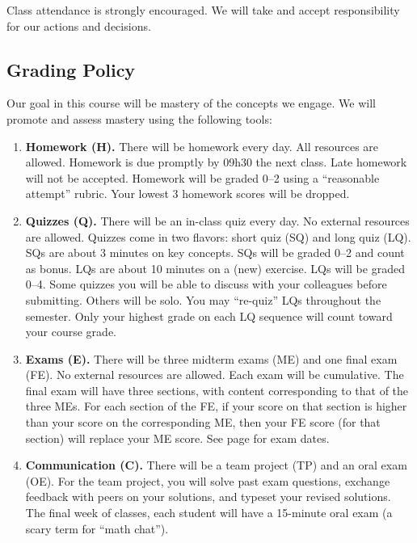 Class attendance is strongly encouraged. We will take and accept responsibility for our actions and decisions.





%
%
%
%

\subsection{Grading Policy}

Our goal in this course will be mastery of the concepts we engage. We will promote and assess mastery using the following tools:
\begin{enumerate}
\item \textbf{Homework (H).} There will be homework every day. All resources are allowed. Homework is due promptly by 09h30 the next class. Late homework will not be accepted. Homework will be graded 0--2 using a ``reasonable attempt'' rubric. Your lowest 3 homework scores will be dropped.
\item \textbf{Quizzes (Q).} There will be an in-class quiz every day. No external resources are allowed. Quizzes come in two flavors: short quiz (SQ) and long quiz (LQ). SQs are about 3 minutes on key concepts. SQs will be graded 0--2 and count as bonus. LQs are about 10 minutes on a (new) exercise. LQs will be graded 0--4. Some quizzes you will be able to discuss with your colleagues before submitting. Others will be solo. You may ``re-quiz'' LQs throughout the semester. Only your highest grade on each LQ sequence will count toward your course grade.
\item \textbf{Exams (E).} There will be three midterm exams (ME) and one final exam (FE). No external resources are allowed. Each exam will be cumulative. The final exam will have three sections, with content corresponding to that of the three MEs. For each section of the FE, if your score on that section is higher than your score on the corresponding ME, then your FE score (for that section) will replace your ME score. See page \pageref{tab : Calendar} for exam dates.
\item \textbf{Communication (C).} There will be a team project (TP) and an oral exam (OE). For the team project, you will solve past exam questions, exchange feedback with peers on your solutions, and typeset your revised solutions. The final week of classes, each student will have a 15-minute oral exam (a scary term for ``math chat'').
\end{enumerate}

